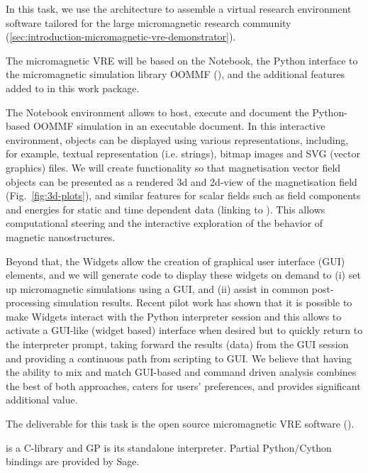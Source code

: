 \begin{workpackage}
\begin{tasklist}
\begin{task}[title=Visualization system for 3d data in web-notebook
,id=vis3d,lead=SR, partners={US,PS,USO}]
\begin{task}[lead=USO,title=Case study: micromagnetic VRE built from
  \TheProject,id=oommf-py-ipython-attributes,PM=6,partners={SR,USH}]
  In this task, we use the \TheProject architecture to assemble a
  virtual research environment software tailored for the large
  micromagnetic research community
  (\ref{sec:introduction-micromagnetic-vre-demonstrator}).

  The micromagnetic VRE will be based on the \Jupyter Notebook, the
  Python interface to the micromagnetic simulation library OOMMF
  (),
  and the additional features added to \Jupyter in this work
  package. 

  The \Jupyter Notebook environment allows to host, execute and
  document the Python-based OOMMF simulation in an executable
  document. In this interactive environment, objects can be displayed
  using various representations, including, for example, textual
  representation (i.e. strings), bitmap images and SVG (vector
  graphics) files. We will create functionality so that magnetisation
  vector field objects can be presented as a rendered 3d and 2d-view
  of the magnetisation field (Fig.~\ref{fig:3d-plots}), and similar
  features for scalar fields such as field components and energies for
  static and time dependent data (linking to
  ). This allows computational steering and the
  interactive exploration of the behavior of magnetic nanostructures.

  Beyond that, the \Jupyter Widgets allow the creation of graphical
  user interface (GUI) elements, and we will generate code to
  display these widgets on demand to (i) set up micromagnetic
  simulations using a GUI, and (ii) assist in common post-processing
  simulation results. Recent pilot work has shown that it is possible
  to make \Jupyter Widgets interact with the Python interpreter
  session and this allows to activate a GUI-like (widget based)
  interface when desired but to quickly return to the interpreter
  prompt, taking forward the results (data) from the GUI session
  \cite{IPython-widget-GUI-demo-youtube-2014} and providing a
  continuous path from scripting to GUI. We believe that having the
  ability to mix and match GUI-based and command driven analysis
  combines the best of both approaches, caters for users' preferences,
  and provides significant additional value.

  The deliverable for this task is the open source micromagnetic VRE
  software ().
\end{task}

\begin{task}[lead=UB,title=Python/Cython bindings for Pari,PM=16,id=pari-python]
  \Pari is a C-library and GP is its standalone interpreter. Partial
  Python/Cython bindings are provided by Sage.


\end{task}
\end{task}
\end{tasklist}
\end{workpackage}
